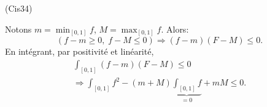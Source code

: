 \begin{tiny}(Cis34)\end{tiny} Notons $m = \min_{\left[ 0,1 \right]}f$, $M = \max_{\left[ 0,1 \right]}f$. Alors:
\[
  \left( f  - m \geq 0 ,\;f - M \leq 0\right) \Rightarrow (f-m)(F-M)\leq 0.
\]
En intégrant, par positivité et linéarité,
\begin{multline*}
\int_{\left[ 0,1 \right]} (f-m)(F-M)\leq 0 \\
\Rightarrow \int_{\left[ 0,1 \right]}f^2 - (m + M)\underset{ = 0}{\underbrace{\int_{\left[ 0,1 \right]}f}} + m M \leq 0.
\end{multline*}

